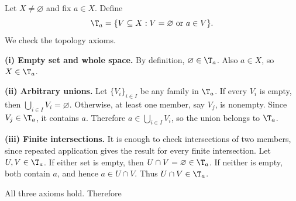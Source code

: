 
Let $X\neq\varnothing$ and fix $a\in X$. Define
\[ \T_a=\{V\subseteq X : V=\varnothing \text{ or } a\in V\}. \]
We check the topology axioms.

\textbf{(i) Empty set and whole space.} By definition, $\varnothing\in\T_a$. Also $a\in X$, so
$X\in\T_a$.

\textbf{(ii) Arbitrary unions.} Let $\{V_i\}_{i\in I}$ be any family in $\T_a$. If every $V_i$
is empty, then $\bigcup_{i\in I}V_i=\varnothing$. Otherwise, at least one member, say $V_j$, is
nonempty. Since $V_j\in\T_a$, it contains $a$. Therefore $a\in\bigcup_{i\in I}V_i$, so the union
belongs to $\T_a$.

\textbf{(iii) Finite intersections.} It is enough to check intersections of two members, since
repeated application gives the result for every finite intersection. Let $U,V\in\T_a$. If either
set is empty, then $U\cap V=\varnothing\in\T_a$. If neither is empty, both contain $a$, and hence
$a\in U\cap V$. Thus $U\cap V\in\T_a$.

All three axioms hold. Therefore 
